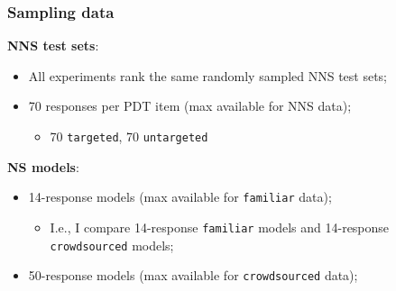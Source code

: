 \documentclass[handout,xcolor={dvipsnames}]{beamer}
\newcommand{\param}[1]{\texttt{#1}}
\begin{document}
\begin{frame}
\frametitle{Sampling data}

\pause
\textbf{NNS test sets}:
\begin{itemize}
\item All experiments rank the same randomly sampled NNS test sets;
\item 70 responses per PDT item (max available for NNS data);
\begin{itemize}
\item 70 \param{targeted}, 70 \param{untargeted}
\end{itemize}
\end{itemize}

\vspace{1.5em}

\pause
\textbf{NS models}:
\begin{itemize}
\item 14-response models (max available for \param{familiar} data);
\begin{itemize}
\item I.e., I compare 14-response \param{familiar} models and 14-response \param{crowd\-sourced} models;
\end{itemize}
\item 50-response models (max available for \param{crowdsourced} data);
\end{itemize}
\end{frame}
\end{document}
